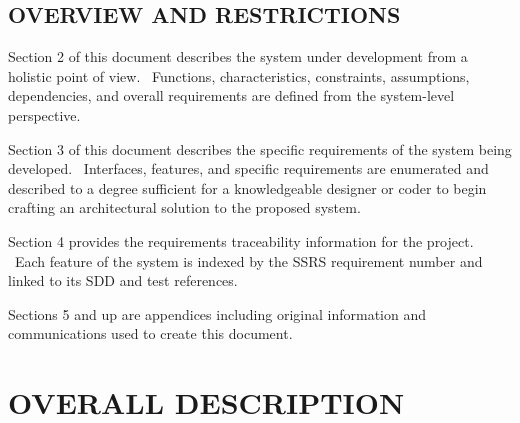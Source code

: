 \documentclass[letterpaper, 10pt, draftclsnofoot, onecolumn]{IEEEtran}
\begin{document}
\subsection[OVERVIEW AND
RESTRICTIONS]{\rmfamily\bfseries\color{black}
OVERVIEW AND RESTRICTIONS}
{\itshape\color{black}
}
{\color{black}
}


\bigskip

{\color{black}
Section 2 of this document describes the system under development from a
holistic point of view. \ Functions, characteristics, constraints,
assumptions, dependencies, and overall requirements are defined from
the system-level perspective.}


\bigskip

{\color{black}
Section 3 of this document describes the specific requirements of the
system being developed. \ Interfaces, features, and specific
requirements are enumerated and described to a degree sufficient for a
knowledgeable designer or coder to begin crafting an architectural
solution to the proposed system.}


\bigskip

{\color{black}
Section 4 provides the requirements traceability information for the
project. \ Each feature of the system is indexed by the SSRS
requirement number and linked to its SDD and test references.}


\bigskip

{\color{black}
Sections 5 and up are appendices including original information and
communications used to create this document.}




\clearpage\section[OVERALL
DESCRIPTION]{\rmfamily\bfseries\color{black}
OVERALL DESCRIPTION}
\begin{comment}
{\selectlanguage{english}\color{black}
\foreignlanguage{english}{\textit{This section of the document should
describe the general factors that affect the product and its
requirements. \ This section does not state specific requirements.
\ Instead, it provides the background for those requirements, which are
defined in detail in Section 3.}}\foreignlanguage{english}{ \ }}
\end{comment}
\end{document}
